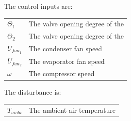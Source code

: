 The control inputs are:

\begin{center}
	\begin{tabular}{l p{10cm}}
		$ \Theta_1 $  & The valve opening degree of the \\
		$ \Theta_2 $  & The valve opening degree of the \\
		$ U_{fan_1} $ & The condenser fan speed         \\
		$ U_{fan_2} $ & The evaporator fan speed        \\
		$ \omega $    & The compressor speed
	\end{tabular}
\end{center}

The disturbance is:

\begin{center}
	\begin{tabular}{l p{10cm}}
		$ T_{ambi} $  & The ambient air temperature
	\end{tabular}
\end{center}